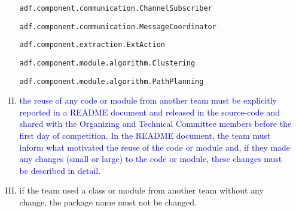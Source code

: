 \documentclass{article}
\begin{document}
\begin{enumerate}[(a)]
\begin{enumerate}[I.]
  \small
  \texttt{adf.component.communication.ChannelSubscriber}

  \texttt{adf.component.communication.MessageCoordinator}

  \texttt{adf.component.extraction.ExtAction}

  \texttt{adf.component.module.algorithm.Clustering}

  \texttt{adf.component.module.algorithm.PathPlanning}
  \item \textcolor{blue}{the reuse of any code or module from another team must be explicitly reported in a README document and released in the source-code and shared with the Organizing and Technical Committee members before the first day of competition. In the README document, the team must inform what motivated the reuse of the code or module and, if they made any changes (small or large) to the code or module, these changes must be described in detail.}
  \item if the team used a class or module from another team without any change, the package name must not be changed.
\end{enumerate}


\end{enumerate}
\end{document}
